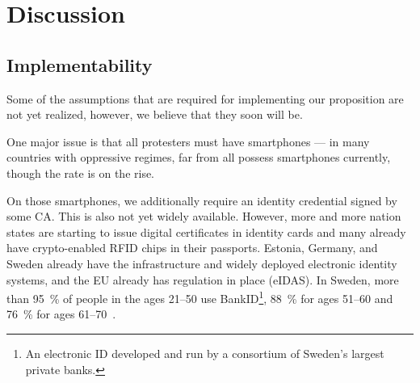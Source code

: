 \section{Discussion}%
\label{Discussion}

\subsection{Implementability}

Some of the assumptions that are required for implementing our proposition are 
not yet realized, however, we believe that they soon will be.

One major issue is that all protesters must have smartphones --- in many 
countries with oppressive regimes, far from all possess smartphones
currently, though the rate is on the rise.

On those smartphones, we additionally require an identity credential
signed by some \ac{CA}.  This is also not yet widely available.
However, more and more nation states are starting to issue digital
certificates in identity cards and many already have crypto-enabled
RFID chips in their passports.  \Eg Estonia, Germany, and Sweden
already have the infrastructure and widely deployed electronic
identity systems, and the EU already has regulation in place (eIDAS).
In Sweden, more than \SI{95}{\%} of people in the ages 21--50 use 
BankID\footnote{%
  An electronic ID developed and run by a consortium of Sweden's largest 
  private banks.
}, \SI{88}{\%} for ages 51--60 and \SI{76}{\%} for ages 
61--70~\cite{BankID-stats}.

